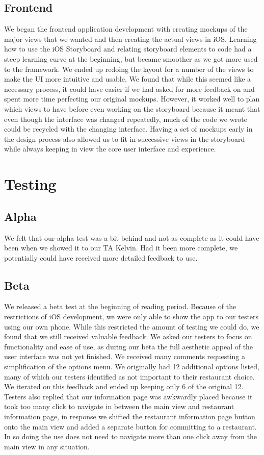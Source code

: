 \documentclass[12pt]{article}
\begin{document}
\subsection{Frontend}
We began the frontend application development with creating mockups of the major views that we wanted and then creating the actual views in iOS. Learning how to use the iOS Storyboard and relating storyboard elements to code had a steep learning curve at the beginning, but became smoother as we got more used to the framework. We ended up redoing the layout for a number of the views to make the UI more intuitive and usable. We found that while this seemed like a necessary process, it could have easier if we had asked for more feedback on and spent more time perfecting our original mockups. However, it worked well to plan which views to have before even working on the storyboard because it meant that even though the interface was changed repeatedly, much of the code we wrote could be recycled with the changing interface. Having a set of mockups early in the design process also allowed us to fit in successive views in the storyboard while always keeping in view the core user interface and experience.

\section{Testing}
\subsection{Alpha}
We felt that our alpha test was a bit behind and not as complete as it could have been when we showed it to our TA Kelvin. Had it been more complete, we potentially could have received more detailed feedback to use. 

\subsection{Beta}
We released a beta test at the beginning of reading period. Because of the restrictions of iOS development, we were only able to show the app to our testers using our own phone. While this restricted the amount of testing we could do, we found that we still received valuable feedback. We asked our testers to focus on functionality and ease of use, as during our beta the full aesthetic appeal of the user interface was not yet finished. We received many comments requesting a simplification of the options menu. We originally had 12 additional options listed, many of which our testers identified as not important to their restaurant choice. We iterated on this feedback and ended up keeping only 6 of the original 12. Testers also replied that our information page was awkwardly placed because it took too many click to navigate in between the main view and restaurant information page, in response we shifted the restaurant information page button onto the main view and added a separate button for committing to a restaurant. In so doing the use does not need to navigate more than one click away from the main view in any situation.
\end{document}
